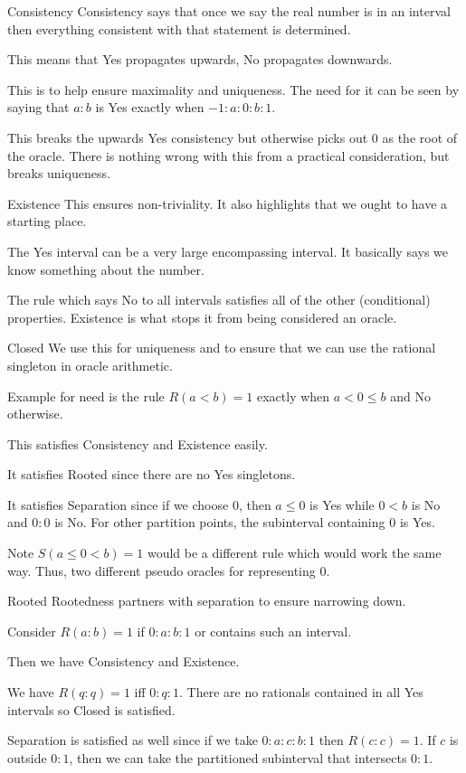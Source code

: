 \documentclass{beamer}
\begin{document}
\begin{frame}{Consistency}
    Consistency says that once we say the real number is in an interval then everything consistent with that statement is determined. 

    This means that Yes propagates upwards, No propagates downwards. 

    This is to help ensure maximality and uniqueness. The need for it can be seen by saying that $a:b$ is Yes exactly when $-1 : a: 0 : b: 1$. 

    This breaks the upwards Yes consistency but otherwise picks out 0 as the root of the oracle. There is nothing wrong with this from a practical consideration, but breaks uniqueness. 
    
\end{frame}


\begin{frame}{Existence}
    This ensures non-triviality. It also highlights that we ought to have a starting place. 

    The Yes interval can be a very large encompassing interval. It basically says we know something about the number. 

    The rule which says No to all intervals satisfies all of the other (conditional) properties. Existence is what stops it from being considered an oracle. 
\end{frame}



\begin{frame}{Closed}
    We use this for uniqueness and to ensure that we can use the rational singleton in oracle arithmetic. 

    Example for need is the rule $R(a<b)= 1$ exactly when $a < 0 \leq b$ and No otherwise. 

    This satisfies Consistency and Existence easily.  

    It satisfies Rooted since there are no Yes singletons. 

    It satisfies Separation since if we choose $0$, then $a \leq 0$ is Yes while $0 < b$ is No and $0:0$ is No. For other partition points, the subinterval containing $0$ is Yes. 

    Note $S(a \leq 0 < b )= 1$ would be a different rule which would work the same way. Thus, two different pseudo oracles for representing 0. 
    
\end{frame}

\begin{frame}{Rooted}
     Rootedness partners with separation to ensure narrowing down. 

     Consider $R(a:b) = 1$ if $0:a:b:1$ or contains such an interval. 

     Then we have Consistency and Existence. 

     We have $R(q:q) = 1$ iff $0:q:1$. There are no rationals contained in all Yes intervals so Closed is satisfied. 

     Separation is satisfied as well since if we take $0:a:c:b:1$ then $R(c:c)=1$. If $c$ is outside $0:1$, then we can take the partitioned subinterval that intersects $0:1$.
\end{frame}
\end{document}
